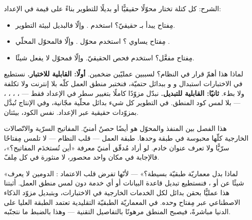 الشرح: كل كتلة  تختار محوّلًا حقيقيًّا أو بديلًا للتطوير
 بناءً على قيمة في الإعداد:
\begin{itemize}
\item مِفتاح  يبدأ بـ  حقيقيّ؟ استخدم
  . وإلّا فالبديل  لبيئة التطوير.
\item مِفتاح  يساوي ؟ استخدم محوّل .
  وإلّا فالمحوّل المحلّي .
\item مِفتاح  مفعَّل؟ استخدم فحص  الحقيقيّ.
  وإلّا فمحوّل لا يفعل شيئًا.
\end{itemize}

\begin{why}
لماذا هذا أهمّ قرار في النظام؟ لسببين عمليّين ضخمين. \textbf{أولًا: القابلية
للاختبار.} نستطيع في الاختبارات استبدال  و و ببدائل
حتميّة، فنختبر منطق العمل كلّه بلا إنترنت ولا تكلفة ولا بطء. \textbf{ثانيًا:
القابلية للتبديل.} نبدّل مزوّدًا كاملًا بتغيير سطر في الإعداد فقط — ،
، ، ،
 — بلا لمس كود المنطق. في التطوير كل شيء بدائل محلّية مجّانية،
وفي الإنتاج تُبدَّل بمزوّدات حقيقية عبر الإعداد. نفس الكود، بيئتان.
\end{why}

\begin{secnote}
هذا الفصل بين المنفذ والمحوّل هو أيضًا حصنٌ أمنيّ. المفاتيح السرّية والاتّصالات
الخارجية كلّها محبوسة في طبقة  وحدها. طبقة العمل — قلب النظام —
لا تلمس مِفتاحًا سرّيًّا ولا تعرف عنوان خادم. لو أراد مُدقّق أمنيّ معرفة «أين تُستخدَم
المفاتيح؟»، فالإجابة في مكان واحد محصور، لا منثورة في كل مِلفّ.
\end{secnote}

\begin{qa}
«لماذا  بدل معماريّة طبقيّة بسيطة؟» — لأنّها تفرض قلب
الاعتماد : الدومين لا يعرف شيئًا عن  أو
، فنستطيع تبديل قاعدة البيانات أو أي خدمة دون لمس منطق العمل. أثبتنا هذا
عمليًّا بحقن بدائل  لكل الخدمات الخارجية في الاختبارات، وبتبديل مزوّد
الذكاء الاصطناعي عبر مِفتاح  وحده. في المعماريّة الطبقيّة
التقليدية تعتمد الطبقة العليا على الدنيا مباشرةً، فيصبح المنطق مرهونًا بالتفاصيل
التقنية — وهذا بالضبط ما نتجنّبه.
\end{qa}

